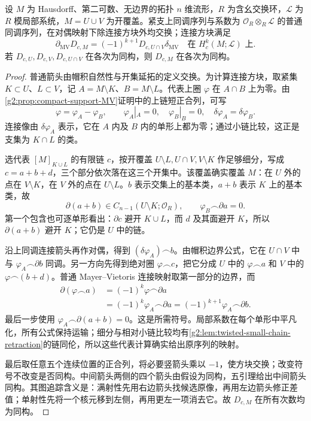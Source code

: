\begin{lemma}\label{g2:lem:duality-MV}
	设 \(M\) 为 Hausdorff、第二可数、无边界的拓扑 \(n\) 维流形，\(R\) 为含幺交换环，\(\mathcal L\) 为 \(R\) 模局部系统，\(M=U\cup V\) 为开覆盖。紧支上同调序列与系数为 \(\mathcal O_R\otimes_R\mathcal L\) 的普通同调序列，在对偶映射下除连接方块外均交换；连接方块满足
	\begin{equation}\label{g2:eq:duality-MV-sign}
		\partial_{\mathrm{MV}}D_{c,M}=(-1)^{k+1}D_{c,U\cap V}\delta_{\mathrm{MV}}
		\quad\text{在 }H_c^k(M;\mathcal L)\text{ 上}.
	\end{equation}
	若 \(D_{c,U},D_{c,V},D_{c,U\cap V}\) 在各次为同构，则 \(D_{c,M}\) 在各次为同构。
\end{lemma}
\begin{proof}
	普通箭头由帽积自然性与开集延拓的定义交换。为计算连接方块，取紧集 \(K\subset U\)、\(L\subset V\)，记 \(A=M\setminus K\)、\(B=M\setminus L\)。代表上圈 \(\varphi\) 在 \(A\cap B\) 上为零。由\cref{g2:prop:compact-support-MV}证明中的上链短正合列，可写
	\[
		\varphi=\varphi_A-\varphi_B,\qquad
		\varphi_A|_A=0,\quad\varphi_B|_B=0,\quad
		\delta\varphi_A=\delta\varphi_B.
	\]
	连接像由 \(\delta\varphi_A\) 表示，它在 \(A\) 内及 \(B\) 内的单形上都为零；通过小链比较，这正是支集为 \(K\cap L\) 的类。

	选代表 \([M]_{K\cup L}\) 的有限链 \(c\)，按开覆盖 \(U\setminus L,U\cap V,V\setminus K\) 作足够细分，写成 \(c=a+b+d\)，三个部分依次落在这三个开集中。该覆盖确实覆盖 \(M\)：在 \(U\) 外的点在 \(V\setminus K\)，在 \(V\) 外的点在 \(U\setminus L\)。\(b\) 表示交集上的基本类，\(a+b\) 表示 \(K\) 上的基本类，故
	\[
		\partial(a+b)\in C_{n-1}(U\setminus K;\mathcal O_R),\qquad
		\varphi_B\frown\partial a=0.
	\]
	第一个包含也可逐单形看出：\(\partial c\) 避开 \(K\cup L\)，而 \(d\) 及其面避开 \(K\)，所以 \(\partial(a+b)\) 避开 \(K\)；它仍是 \(U\) 中的链。

	沿上同调连接箭头再作对偶，得到 \((\delta\varphi_A)\frown b\)。由帽积边界公式，它在 \(U\cap V\) 中与 \(\varphi_A\frown\partial b\) 同调。另一方向先得到绝对圈 \(\varphi\frown c\)，把它分成 \(U\) 中的 \(\varphi\frown a\) 和 \(V\) 中的 \(\varphi\frown(b+d)\)。普通 Mayer--Vietoris 连接映射取第一部分的边界，而
	\[
		\begin{aligned}
			\partial(\varphi\frown a)
			&=(-1)^k\varphi\frown\partial a\\
			&=(-1)^k\varphi_A\frown\partial a
			=(-1)^{k+1}\varphi_A\frown\partial b.
		\end{aligned}
	\]
	最后一步使用 \(\varphi_A\frown\partial(a+b)=0\)。这是所需符号。局部系数在每个单形中平凡化，所有公式保持运输；细分与相对小链比较均有\cref{g2:lem:twisted-small-chain-retraction}的链同伦，所以这些代表计算确实给出原序列的映射。

	最后取任意五个连续位置的正合列，将必要竖箭头乘以 \(-1\)，使方块交换；改变符号不改变是否同构。中间箭头两侧的四个箭头由假设为同构，五引理给出中间箭头同构。其图追踪含义是：满射性先用右边箭头找候选原像，再用左边箭头修正差值；单射性先将一个核元移到左侧，再用更左一项消去它。故 \(D_{c,M}\) 在所有次数均为同构。
\end{proof}

